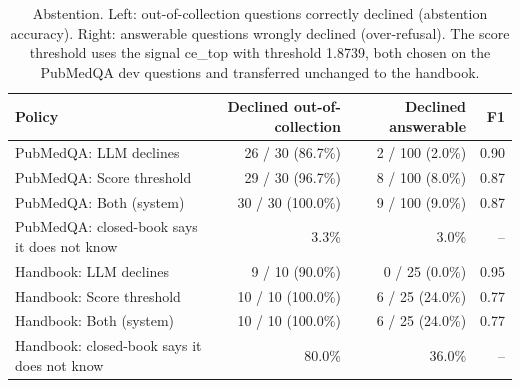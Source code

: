 \begin{table}[t]
\centering\small
\begin{tabular}{lrrr}
\toprule
Policy & Declined out-of-collection & Declined answerable & F1 \\
\midrule
PubMedQA: LLM declines & 26 / 30 (86.7\%) & 2 / 100 (2.0\%) & 0.90 \\
PubMedQA: Score threshold & 29 / 30 (96.7\%) & 8 / 100 (8.0\%) & 0.87 \\
PubMedQA: Both (system) & 30 / 30 (100.0\%) & 9 / 100 (9.0\%) & 0.87 \\
PubMedQA: closed-book says it does not know & 3.3\% & 3.0\% & -- \\
\midrule
Handbook: LLM declines & 9 / 10 (90.0\%) & 0 / 25 (0.0\%) & 0.95 \\
Handbook: Score threshold & 10 / 10 (100.0\%) & 6 / 25 (24.0\%) & 0.77 \\
Handbook: Both (system) & 10 / 10 (100.0\%) & 6 / 25 (24.0\%) & 0.77 \\
Handbook: closed-book says it does not know & 80.0\% & 36.0\% & -- \\
\bottomrule
\end{tabular}
\caption{Abstention. Left: out-of-collection questions correctly declined (abstention accuracy). Right: answerable questions wrongly declined (over-refusal). The score threshold uses the signal ce\_top with threshold 1.8739, both chosen on the PubMedQA dev questions and transferred unchanged to the handbook.}
\label{tab:abstention}
\end{table}
